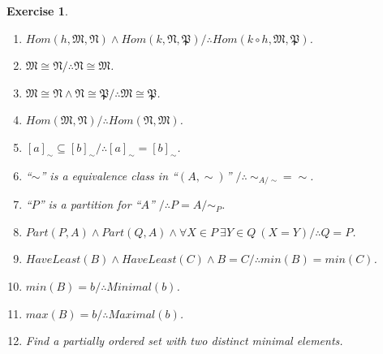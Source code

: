 \documentclass[10pt,a4paper]{book}
\newtheorem{exercise}{Exercise}[section]
\begin{document}
\begin{exercise}



    \begin{enumerate}
        \item $Hom(h,\mathfrak{M},\mathfrak{N}) \land
                  Hom(k,\mathfrak{N},\mathfrak{P})
                  / \therefore Hom(k\circ h,\mathfrak{M},\mathfrak{P})$.



        \item $\mathfrak{M}\cong\mathfrak{N}
                  / \therefore \mathfrak{N}\cong\mathfrak{M}$.

        \item $\mathfrak{M}\cong\mathfrak{N}\land
                  \mathfrak{N}\cong\mathfrak{P}
                  / \therefore \mathfrak{M}\cong\mathfrak{P}$.



        \item $Hom(\mathfrak{M},\mathfrak{N})
                  / \therefore Hom(\mathfrak{N},\mathfrak{M})$.



        \item $[a]_{\sim}\subseteq[b]_{\sim}
                  / \therefore [a]_{\sim}=[b]_{\sim}$.


        \item   ``$\sim$'' is a equivalence class in ``$(A,\sim)$''  $  / \therefore \ \sim_{A/\sim}=\sim$.

        \item ``$P$'' is a partition for ``$A$''  $ /  \therefore P=A/\sim_P$.

        \item $Part(P,A)\land Part(Q,A)
                  \land \forall X\in P\ \exists Y\in Q\ (X = Y)
                  / \therefore Q = P$.


        \item $HaveLeast(B)\land HaveLeast(C)
                  \land B=C
                  / \therefore min(B)=min(C)$.



        \item $min(B)=b / \therefore Minimal(b)$.

        \item $max(B)=b / \therefore Maximal(b)$.



        \item Find a partially ordered set with two distinct minimal elements.


\end{enumerate}
\end{exercise}
\end{document}
